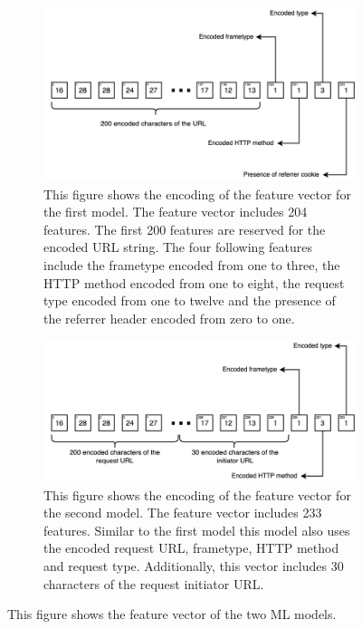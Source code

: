 \begin{figure}[ht!]  
  \centering
  \begin{subfigure}[b]{.47\textwidth}
      \centering
      \includegraphics[width=\linewidth ]{images/model1.png}
      \caption{This figure shows the encoding of the feature vector for the first model. The feature vector includes 204 features. The first 200 features are reserved for the encoded URL
   string. The four following features include the frametype encoded from one to three, the HTTP method encoded from one to eight, the 
 request type encoded from one to twelve and the presence of the referrer header encoded from zero to one.}
      \label{fig:featModel1}
  \end{subfigure}
  \hfill
  \begin{subfigure}[b]{.47\textwidth}
      \centering
      \includegraphics[width=\linewidth, keepaspectratio]{images/model2.png}
      \caption{This figure shows the encoding of the feature vector for the second model. The feature vector includes 233 features. Similar to the 
        first model this model also uses the encoded request URL, frametype, HTTP method and request type. Additionally, this vector includes 30 characters
        of the request initiator URL.
      }
      \label{fig:featModel2}
  \end{subfigure}
  \label{}
  \caption{This figure shows the feature vector of the two ML models.}
\end{figure}  

